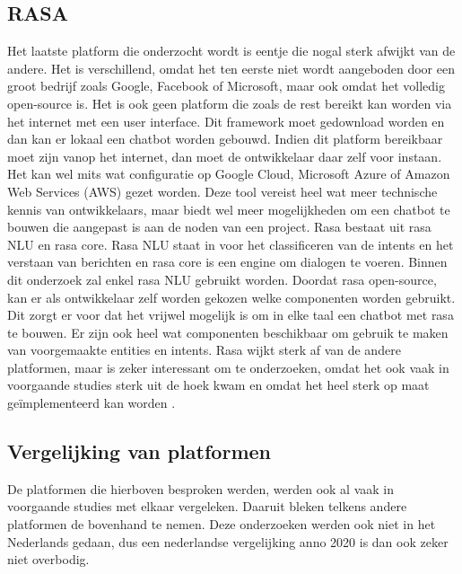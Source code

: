 \subsection{RASA}
\label{subsec:nlp-platformen-rasa}

Het laatste platform die onderzocht wordt is eentje die nogal sterk afwijkt van de andere. Het is verschillend, omdat het ten eerste niet wordt aangeboden door een groot bedrijf zoals Google, Facebook of Microsoft, maar ook omdat het volledig open-source is. Het is ook geen platform die zoals de rest bereikt kan worden via het internet met een user interface. Dit framework moet gedownload worden en dan kan er lokaal een chatbot worden gebouwd. Indien dit platform bereikbaar moet zijn vanop het internet, dan moet de ontwikkelaar daar zelf voor instaan. Het kan wel mits wat configuratie op Google Cloud, Microsoft Azure of Amazon Web Services (AWS) gezet worden. Deze tool vereist heel wat meer technische kennis van ontwikkelaars, maar biedt wel meer mogelijkheden om een chatbot te bouwen die aangepast is aan de noden van een project. Rasa bestaat uit rasa NLU en rasa core.  Rasa NLU staat in voor het classificeren van de intents en het verstaan van berichten en rasa core is een engine om dialogen te voeren. Binnen dit onderzoek zal enkel rasa NLU gebruikt worden. Doordat rasa open-source, kan er als ontwikkelaar zelf worden gekozen welke componenten worden gebruikt. Dit zorgt er voor dat het vrijwel mogelijk is om in elke taal een chatbot met rasa te bouwen. Er zijn ook heel wat componenten beschikbaar om gebruik te maken van voorgemaakte entities en intents. Rasa wijkt sterk af van de andere platformen, maar is zeker interessant om te onderzoeken, omdat het ook vaak in voorgaande studies sterk uit de hoek kwam en omdat het heel sterk op maat geïmplementeerd kan worden \autocite{RASA2020}.

\subsection{Vergelijking van platformen}
\label{subsec:nlp-platformen-vegelijking-platformen}


De platformen die hierboven besproken werden, werden ook al vaak in voorgaande studies met elkaar vergeleken. Daaruit bleken telkens andere platformen de bovenhand te nemen. Deze onderzoeken werden ook niet in het Nederlands gedaan, dus een nederlandse vergelijking anno 2020 is dan ook zeker niet overbodig.

